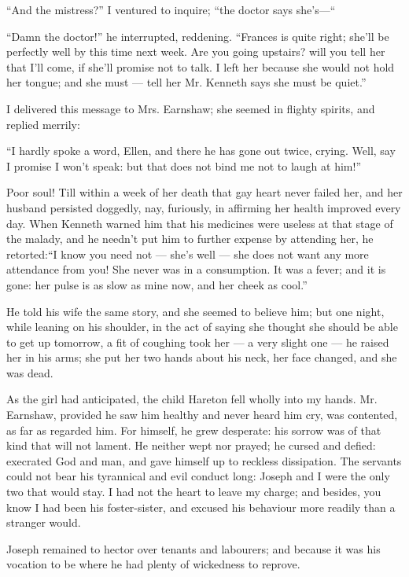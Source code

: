 \par “And the mistress?” I ventured to inquire; “the doctor says she's—“
\par “Damn the doctor!” he interrupted, reddening. “Frances is quite right; she'll be perfectly well by this time next week. Are you going upstairs? will you tell her that I'll come, if she'll promise not to talk. I left her because she would not hold her tongue; and she must — tell her Mr. Kenneth says she must be quiet.”
\par I delivered this message to Mrs. Earnshaw; she seemed in flighty spirits, and replied merrily:
\par “I hardly spoke a word, Ellen, and there he has gone out twice, crying. Well, say I promise I won't speak: but that does not bind me not to laugh at him!”
\par Poor soul! Till within a week of her death that gay heart never failed her, and her husband persisted doggedly, nay, furiously, in affirming her health improved every day. When Kenneth warned him that his medicines were useless at that stage of the malady, and he needn't put him to further expense by attending her, he retorted:“I know you need not — she's well — she does not want any more attendance from you! She never was in a consumption. It was a fever; and it is gone: her pulse is as slow as mine now, and her cheek as cool.”
\par He told his wife the same story, and she seemed to believe him; but one night, while leaning on his shoulder, in the act of saying she thought she should be able to get up tomorrow, a fit of coughing took her — a very slight one — he raised her in his arms; she put her two hands about his neck, her face changed, and she was dead.
\par As the girl had anticipated, the child Hareton fell wholly into my hands. Mr. Earnshaw, provided he saw him healthy and never heard him cry, was contented, as far as regarded him. For himself, he grew desperate: his sorrow was of that kind that will not lament. He neither wept nor prayed; he cursed and defied: execrated God and man, and gave himself up to reckless dissipation. The servants could not bear his tyrannical and evil conduct long: Joseph and I were the only two that would stay. I had not the heart to leave my charge; and besides, you know I had been his foster-sister, and excused his behaviour more readily than a stranger would.
\par Joseph remained to hector over tenants and labourers; and because it was his vocation to be where he had plenty of wickedness to reprove.

